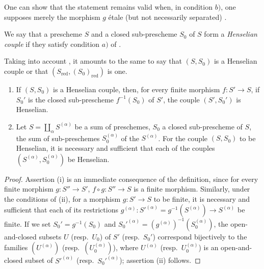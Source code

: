 \begin{remark}[18.5.4.4]
\label{IV.18.5.4.4}
One can show that the statement  remains valid when, in condition $b)$, one supposes merely the morphism $g$ \'etale (but not necessarily separated) \cite[exp.~XII]{SGA1}.
\end{remark}

\begin{definition}[18.5.5]
\label{IV.18.5.5}
We say that a prescheme $S$ and a closed sub-prescheme $S_0$ of $S$ form a \emph{Henselian couple} if they satisfy condition $a)$ of .
\end{definition}

Taking into account , it amounts to the same to say that $(S,S_0)$ is a Henselian couple or that $(S_{\mathrm{red}},(S_0)_{\mathrm{red}})$ is one.

\begin{proposition}[18.5.6]
\label{IV.18.5.6}
\begin{enumerate}
  \item[(i)] If $(S,S_0)$ is a Henselian couple, then, for every finite morphism $f:S'\to S$, if $S_0'$ is the closed sub-prescheme $f^{-1}(S_0)$ of $S'$, the couple $(S',S_0')$ is Henselian.
  \item[(ii)] Let $S=\coprod_\alpha S^{(\alpha)}$ be a sum of preschemes, $S_0$ a closed sub-prescheme of $S$, the sum of sub-preschemes $S_0^{(\alpha)}$ of the $S^{(\alpha)}$.
For the couple $(S,S_0)$ to be Henselian, it is necessary and sufficient that each of the couples $(S^{(\alpha)},S_0^{(\alpha)})$ be Henselian.
\end{enumerate}
\end{proposition}

\begin{proof}
Assertion (i) is an immediate consequence of the definition, since for every finite morphism $g:S''\to S'$, $f\circ g:S''\to S$ is a finite morphism.
Similarly, under the conditions of (ii), for a morphism $g:S'\to S$ to be finite, it is necessary and sufficient that each of its restrictions $g^{(\alpha)}:S'^{(\alpha)}=g^{-1}(S^{(\alpha)})\to S^{(\alpha)}$ be finite.
If we set $S_0'=g^{-1}(S_0)$ and $S_0'^{(\alpha)}=(g^{(\alpha)})^{-1}(S_0^{(\alpha)})$, the open-and-closed subsets $U$ (resp.\ $U_0$) of $S'$ (resp.\ $S_0'$) correspond bijectively to the families $(U^{(\alpha)})$ (resp.\ $(U_0^{(\alpha)})$), where $U^{(\alpha)}$ (resp.\ $U_0^{(\alpha)}$) is an open-and-closed subset of $S'^{(\alpha)}$ (resp.\ $S_0'^{(\alpha)}$); assertion (ii) follows.
\end{proof}

